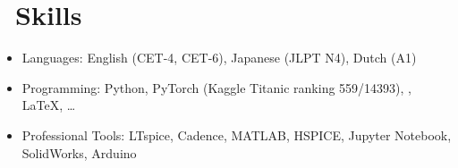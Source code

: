 \documentclass[11pt]{article}
\begin{document}
\section{\makebox[\widthof{\faGraduationCap}][c]{\color{CVBlue}\faWrench}\ Skills}

\begin{itemize}
	\item Languages: English (CET-4, CET-6), Japanese (JLPT N4), Dutch (A1)
	\item Programming: Python, PyTorch (Kaggle Titanic ranking 559/14393), \Cpp, \LaTeX, \ldots
	\item Professional Tools: LTspice, Cadence, MATLAB, HSPICE, Jupyter Notebook, SolidWorks, Arduino

\end{itemize}



\end{document}
